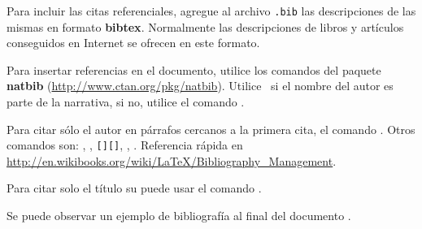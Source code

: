 
Para incluir las citas referenciales, agregue al archivo \texttt{.bib} las descripciones de las mismas en formato \textbf{bibtex}. Normalmente las descripciones de libros y artículos conseguidos en Internet se ofrecen en este formato.

Para insertar referencias en el documento, utilice los comandos del paquete \textbf{natbib} (\url{http://www.ctan.org/pkg/natbib}). Utilice \pa\ si el nombre del autor es parte de la narrativa, si no, utilice el comando \pa.

Para citar sólo el autor en párrafos cercanos a la primera cita, el comando \pa. Otros comandos son: , , \texttt{[][]}, , . Referencia rápida en \url{http://en.wikibooks.org/wiki/LaTeX/Bibliography_Management}.

Para citar solo el título su puede usar el comando .

Se puede observar un ejemplo de bibliografía al final del documento \citep{wikibib}.



